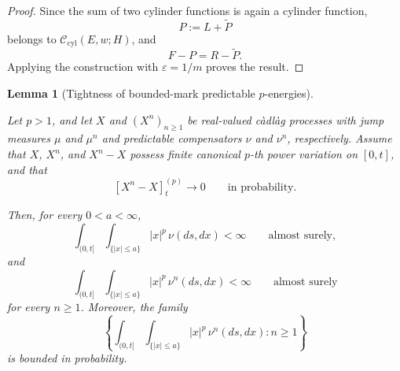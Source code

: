 \documentclass[a4paper,10pt]{article}
\newtheorem{lemma}[thm]{Lemma}
\begin{document}
\begin{proof}
Since the sum of two cylinder functions is again a cylinder function,
\[
        P:=L+\widetilde P
\]
belongs to \(\mathcal C_{\mathrm{cyl}}(E,w;H)\), and
\[
        F-P=R-\widetilde P.
\]
Applying the construction with \(\varepsilon=1/m\) proves the result.
\end{proof}


\begin{lemma}[Tightness of bounded-mark predictable \(p\)-energies]
\label{lem:bounded-mark-predictable-p-energy}

Let \(p>1\), and let \(X\) and \((X^n)_{n\ge1}\) be real-valued
càdlàg processes with jump measures \(\mu\) and \(\mu^n\) and
predictable compensators \(\nu\) and \(\nu^n\), respectively. Assume
that \(X\), \(X^n\), and \(X^n-X\) possess finite canonical \(p\)-th
power variation on \([0,t]\), and that
\[
        [X^n-X]^{(p)}_t
        \longrightarrow0
        \qquad\text{in probability}.
\]

Then, for every \(0<a<\infty\),
\[
\int_{(0,t]}\int_{\{|x|\le a\}}
|x|^p\,\nu(ds,dx)
<
\infty
\qquad\text{almost surely},
\]
and
\[
\int_{(0,t]}\int_{\{|x|\le a\}}
|x|^p\,\nu^n(ds,dx)
<
\infty
\qquad\text{almost surely}
\]
for every \(n\ge1\). Moreover, the family
\[
\left\{
\int_{(0,t]}\int_{\{|x|\le a\}}
|x|^p\,\nu^n(ds,dx)
:
n\ge1
\right\}
\]
is bounded in probability.
\end{lemma}
\end{document}
